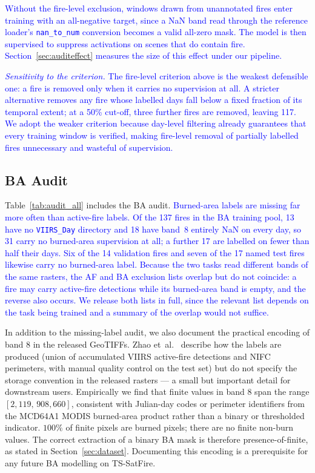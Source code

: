 \documentclass[sensors,article,submit,moreauthors,pdftex]{Definitions/mdpi}
\newcommand{\rev}[1]{\textcolor{blue}{#1}}
\begin{document}
\rev{Without the fire-level exclusion, windows drawn from unannotated fires
enter training with an all-negative target, since a NaN band read through the
reference loader's \texttt{nan\_to\_num} conversion becomes a valid all-zero
mask. The model is then supervised to suppress activations on scenes that do
contain fire. Section~\ref{sec:auditeffect} measures the size of this effect
under our pipeline.}

\rev{\textit{Sensitivity to the criterion.} The fire-level criterion above is
the weakest defensible one: a fire is removed only when it carries no
supervision at all. A stricter alternative removes any fire whose labelled days
fall below a fixed fraction of its temporal extent; at a 50\% cut-off, three
further fires are removed, leaving 117. We adopt the weaker criterion because
day-level filtering already guarantees that every training window is verified,
making fire-level removal of partially labelled fires unnecessary and wasteful
of supervision.}

\subsection{BA Audit}

Table~\ref{tab:audit_all} includes the BA audit. \rev{Burned-area labels are
missing far more often than active-fire labels. Of the 137 fires in the BA
training pool, 13 have no \texttt{VIIRS\_Day} directory and 18 have band~8
entirely NaN on every day, so 31 carry no burned-area supervision at all; a
further 17 are labelled on fewer than half their days. Six of the 14 validation
fires and seven of the 17 named test fires likewise carry no burned-area label.
Because the two tasks read different bands of the same rasters, the AF and BA
exclusion lists overlap but do not coincide: a fire may carry active-fire
detections while its burned-area band is empty, and the reverse also occurs.
We release both lists in full, since the relevant list depends on the task being trained and a summary of the overlap would not suffice.}

In addition to the missing-label audit, we also document the practical encoding of band 8 in the released GeoTIFFs. Zhao et~al.~\cite{zhao2025tssatfire} describe how the labels are produced (union of accumulated VIIRS active-fire detections and NIFC perimeters, with manual quality control on the test set) but do not specify the storage convention in the released rasters --- a small but important detail for downstream users. Empirically we find that finite values in band 8 span the range $[2{,}119,\,908{,}660]$, consistent with Julian-day codes or perimeter identifiers from the MCD64A1 MODIS burned-area product rather than a binary or thresholded indicator. $100\%$ of finite pixels are burned pixels; there are no finite non-burn values. The correct extraction of a binary BA mask is therefore presence-of-finite, as stated in Section~\ref{sec:dataset}. Documenting this encoding is a prerequisite for any future BA modelling on TS-SatFire.
\end{document}
